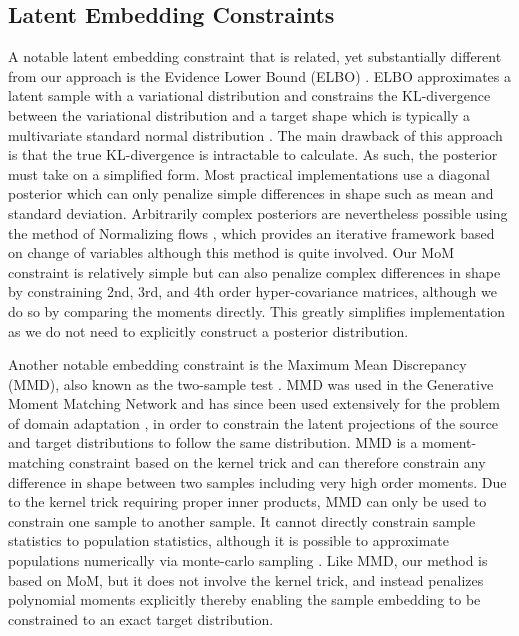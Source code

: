 \documentclass[10pt,twocolumn,letterpaper]{article}
\begin{document}
\subsection{Latent Embedding Constraints}

A notable latent embedding constraint that is related, yet substantially different from our approach is the Evidence Lower Bound (ELBO) \cite{kingma2013auto}.
ELBO approximates a latent sample with a variational distribution and constrains the KL-divergence between the variational distribution and a target shape which is typically a multivariate standard normal distribution \cite{kingma2013auto}. 
The main drawback of this approach is that the true KL-divergence is intractable to calculate.  
As such, the posterior must take on a simplified form. 
Most practical implementations use a diagonal posterior which can only penalize simple differences in shape such as mean and standard deviation.  
Arbitrarily complex posteriors are nevertheless possible using the method of Normalizing flows \cite{rezende2015variational,kingma2016improved,caterini2021variational}, which provides an iterative framework based on change of variables although this method is quite involved.  
Our MoM constraint is relatively simple but can also penalize complex differences in shape by constraining 2nd, 3rd, and 4th order hyper-covariance matrices, although we do so by comparing the moments directly.  
This greatly simplifies implementation as we do not need to explicitly construct a posterior distribution.

Another notable embedding constraint is the Maximum Mean Discrepancy (MMD), also known as the two-sample test \cite{gretton2007kernel}.  
MMD was used in the Generative Moment Matching Network \cite{li2015generative} and has since been used extensively for the problem of domain adaptation \cite{WANG2018135,Wang2023rethinking}, in order to constrain the latent projections of the source and target distributions to follow the same distribution.  
MMD is a moment-matching constraint based on the kernel trick and can therefore constrain any difference in shape between two samples including very high order moments. 
Due to the kernel trick requiring proper inner products, MMD can only be used to constrain one sample to another sample.  
It cannot directly constrain sample statistics to population statistics, although it is possible to approximate populations numerically via monte-carlo sampling \cite{zhao2019infovae}.  
Like MMD, our method is based on MoM, but it does not involve the kernel trick, and instead penalizes polynomial moments explicitly thereby enabling the sample embedding to be constrained to an exact target distribution.
\end{document}
